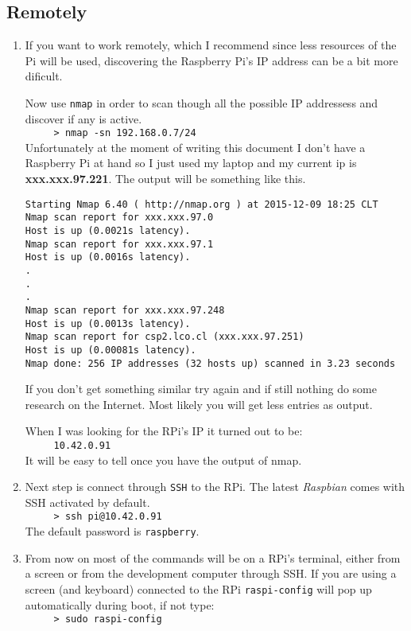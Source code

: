   \subsection{Remotely}
  \begin{enumerate}
   
   \item If you want to work remotely, which I recommend since less resources of the Pi will be used, discovering the Raspberry Pi's IP address can be 
   a bit more dificult.
    
    Now use  \verb=nmap= in order to scan though all the possible IP addressess and discover if any is active.\\
    \verb=     > nmap -sn 192.168.0.7/24=  \\
    Unfortunately at the moment of writing this document I don't have a Raspberry Pi at hand so I just used my laptop and my current ip is 
    \textbf{ xxx.xxx.97.221}. The output will be something like this. 
    \begin{verbatim}
Starting Nmap 6.40 ( http://nmap.org ) at 2015-12-09 18:25 CLT
Nmap scan report for xxx.xxx.97.0
Host is up (0.0021s latency).
Nmap scan report for xxx.xxx.97.1
Host is up (0.0016s latency).
.
.
.
Nmap scan report for xxx.xxx.97.248
Host is up (0.0013s latency).
Nmap scan report for csp2.lco.cl (xxx.xxx.97.251)
Host is up (0.00081s latency).
Nmap done: 256 IP addresses (32 hosts up) scanned in 3.23 seconds
\end{verbatim}
    If you don't get something similar try again and if still nothing do some research on the Internet.
    Most likely you will get less entries as output. 
    
    
    When I was looking for the RPi's IP it turned out to be:\\
    \verb=     10.42.0.91=\\
    It will be easy to tell once you have the output of nmap.
    
   
    \item Next step is connect through \verb=SSH= to the RPi. The latest \emph{Raspbian} comes with SSH activated by default.\\
    \verb=     > ssh pi@10.42.0.91=\\
    The default password is \verb=raspberry=.
   \item From now on most of the commands will be on a RPi's terminal, either from a screen or from the development computer through SSH.
    If you are using a screen (and keyboard) connected to the RPi \verb=raspi-config= will pop up automatically during boot, if not type:\\
	  \verb=     > sudo raspi-config=\\


\end{enumerate}
